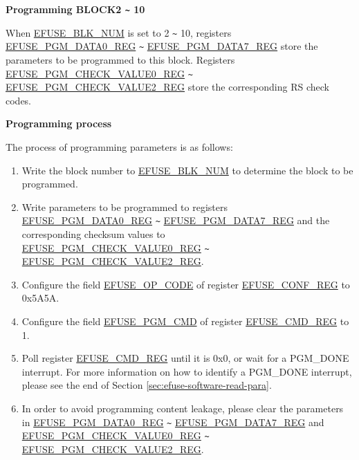\documentclass[main\_\_EN.tex]{subfiles}
\begin{document}
{\bfseries Programming BLOCK2 \verb+~+ 10}

When \hyperref[fielddesc:EFUSEBLKNUM]{EFUSE\_BLK\_NUM} is set to 2 \verb+~+ 10, registers \hyperref[regdesc:EFUSEPGMDATA0REG]{EFUSE\_PGM\_DATA0\_REG} \verb+~+ \hyperref[regdesc:EFUSEPGMDATA7REG]{EFUSE\_PGM\_DATA7\_REG} store the parameters to be programmed to this block. Registers\\ \hyperref[regdesc:EFUSEPGMCHECKVALUE0REG]{EFUSE\_PGM\_CHECK\_VALUE0\_REG} \verb+~+ \hyperref[regdesc:EFUSEPGMCHECKVALUE2REG]{EFUSE\_PGM\_CHECK\_VALUE2\_REG} store the corresponding RS check codes.

{\bfseries Programming process}

The process of programming parameters is as follows:

\begin{enumerate}
\item Write the block number to \hyperref[fielddesc:EFUSEBLKNUM]{EFUSE\_BLK\_NUM} to determine the block to be programmed.

\item Write parameters to be programmed to registers \hyperref[regdesc:EFUSEPGMDATA0REG]{EFUSE\_PGM\_DATA0\_REG} \verb+~+ \hyperref[regdesc:EFUSEPGMDATA7REG]{EFUSE\_PGM\_DATA7\_REG} and the corresponding checksum values to\\ \hyperref[regdesc:EFUSEPGMCHECKVALUE0REG]{EFUSE\_PGM\_CHECK\_VALUE0\_REG} \verb+~+ \hyperref[regdesc:EFUSEPGMCHECKVALUE2REG]{EFUSE\_PGM\_CHECK\_VALUE2\_REG}.

\item Configure the field \hyperref[fielddesc:EFUSEOPCODE]{EFUSE\_OP\_CODE} of register \hyperref[regdesc:EFUSECONFREG]{EFUSE\_CONF\_REG} to 0x{}5A5A.

\item Configure the field \hyperref[fielddesc:EFUSEPGMCMD]{EFUSE\_PGM\_CMD} of register \hyperref[regdesc:EFUSECMDREG]{EFUSE\_CMD\_REG} to 1.

\item Poll register \hyperref[regdesc:EFUSECMDREG]{EFUSE\_CMD\_REG} until it is 0x{}0, or wait for a PGM\_DONE interrupt. For more information on how to identify a PGM\_DONE interrupt, please see the end of Section \ref{sec:efuse-software-read-para}.

\item In order to avoid programming content leakage, please clear the parameters in \hyperref[regdesc:EFUSEPGMDATA0REG]{EFUSE\_PGM\_DATA0\_REG} \verb+~+ \hyperref[regdesc:EFUSEPGMDATA7REG]{EFUSE\_PGM\_DATA7\_REG} and \\ \hyperref[regdesc:EFUSEPGMCHECKVALUE0REG]{EFUSE\_PGM\_CHECK\_VALUE0\_REG} \verb+~+ \hyperref[regdesc:EFUSEPGMCHECKVALUE2REG]{EFUSE\_PGM\_CHECK\_VALUE2\_REG}.


\end{enumerate}
\end{document}

